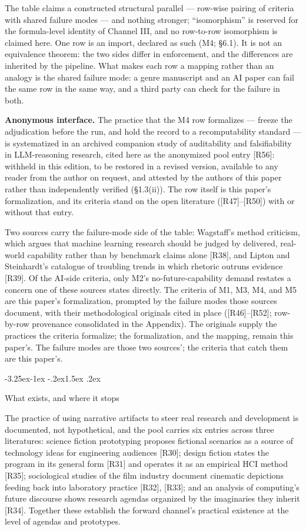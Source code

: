 \documentclass[11pt,a4paper]{article}
\makeatletter
\renewcommand\subsection{\@startsection{subsection}{2}{\z@}%
  {-3.25ex\@plus -1ex \@minus -.2ex}{1.5ex \@plus .2ex}%
  {\normalfont\large\bfseries\raggedright}}
\makeatother
\begin{document}
The table claims a constructed structural parallel — row-wise pairing of criteria with shared failure modes — and nothing stronger; ``isomorphism'' is reserved for the formula-level identity of Channel III, and no row-to-row isomorphism is claimed here. One row is an import, declared as such (M4; §6.1). It is not an equivalence theorem: the two sides differ in enforcement, and the differences are inherited by the pipeline. What makes each row a mapping rather than an analogy is the shared failure mode: a genre manuscript and an AI paper can fail the same row in the same way, and a third party can check for the failure in both.

\textbf{Anonymous interface.} The practice that the M4 row formalizes — freeze the adjudication before the run, and hold the record to a recomputability standard — is systematized in an archived companion study of auditability and falsifiability in LLM-reasoning research, cited here as the anonymized pool entry [R56]: withheld in this edition, to be restored in a revised version, available to any reader from the author on request, and attested by the authors of this paper rather than independently verified (§1.3(ii)). The row itself is this paper's formalization, and its criteria stand on the open literature ([R47]–[R50]) with or without that entry.

Two sources carry the failure-mode side of the table: Wagstaff's method criticism, which argues that machine learning research should be judged by delivered, real-world capability rather than by benchmark claims alone [R38], and Lipton and Steinhardt's catalogue of troubling trends in which rhetoric outruns evidence [R39]. Of the AI-side criteria, only M2's no-future-capability demand restates a concern one of these sources states directly. The criteria of M1, M3, M4, and M5 are this paper's formalization, prompted by the failure modes those sources document, with their methodological originals cited in place ([R46]–[R52]; row-by-row provenance consolidated in the Appendix). The originals supply the practices the criteria formalize; the formalization, and the mapping, remain this paper's. The failure modes are those two sources'; the criteria that catch them are this paper's.

\subsection{What exists, and where it stops}

The practice of using narrative artifacts to steer real research and development is documented, not hypothetical, and the pool carries six entries across three literatures: science fiction prototyping proposes fictional scenarios as a source of technology ideas for engineering audiences [R30]; design fiction states the program in its general form [R31] and operates it as an empirical HCI method [R35]; sociological studies of the film industry document cinematic depictions feeding back into laboratory practice [R32], [R33]; and an analysis of computing's future discourse shows research agendas organized by the imaginaries they inherit [R34]. Together these establish the forward channel's practical existence at the level of agendas and prototypes.
\end{document}
